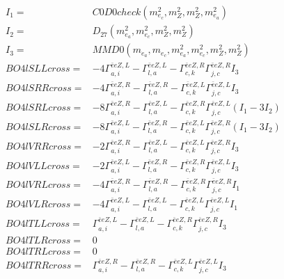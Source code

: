 \documentclass[A4,landscape]{article}
\begin{document}
\begin{align} 
I_1 = & C0D0check(m^2_{e_{{c}}}, m^2_{Z}, m^2_{Z}, m^2_{e_{{a}}}) \\ 
I_2 = & D_{27}(m^2_{e_{{a}}}, m^2_{e_{{c}}}, m^2_{Z}, m^2_{Z}) \\ 
I_3 = & MMD0(m_{e_{{a}}}, m_{e_{{c}}}, m^2_{e_{{a}}}, m^2_{e_{{c}}}, m^2_{Z}, m^2_{Z}) \\ 
  BO4lSLLcross= & -4  \Gamma^{\bar{e}e Z ,L}_{a, i} - \Gamma^{\bar{e}e Z ,L} _{l, a} - \Gamma^{\bar{e}e Z ,R} _{c, k} \Gamma^{\bar{e}e Z ,R}_{j, c} I_3 \\ 
  BO4lSRRcross= & -4  \Gamma^{\bar{e}e Z ,R}_{a, i} - \Gamma^{\bar{e}e Z ,R} _{l, a} - \Gamma^{\bar{e}e Z ,L} _{c, k} \Gamma^{\bar{e}e Z ,L}_{j, c} I_3 \\ 
  BO4lSRLcross= & -8  \Gamma^{\bar{e}e Z ,R}_{a, i} - \Gamma^{\bar{e}e Z ,L} _{l, a} - \Gamma^{\bar{e}e Z ,R} _{c, k} \Gamma^{\bar{e}e Z ,L}_{j, c} (I_1 - 3 I_2) \\ 
  BO4lSLRcross= & -8  \Gamma^{\bar{e}e Z ,L}_{a, i} - \Gamma^{\bar{e}e Z ,R} _{l, a} - \Gamma^{\bar{e}e Z ,L} _{c, k} \Gamma^{\bar{e}e Z ,R}_{j, c} (I_1 - 3 I_2) \\ 
  BO4lVRRcross= & -2  \Gamma^{\bar{e}e Z ,R}_{a, i} - \Gamma^{\bar{e}e Z ,L} _{l, a} - \Gamma^{\bar{e}e Z ,L} _{c, k} \Gamma^{\bar{e}e Z ,R}_{j, c} I_3 \\ 
  BO4lVLLcross= & -2  \Gamma^{\bar{e}e Z ,L}_{a, i} - \Gamma^{\bar{e}e Z ,R} _{l, a} - \Gamma^{\bar{e}e Z ,R} _{c, k} \Gamma^{\bar{e}e Z ,L}_{j, c} I_3 \\ 
  BO4lVRLcross= & -4  \Gamma^{\bar{e}e Z ,R}_{a, i} - \Gamma^{\bar{e}e Z ,R} _{l, a} - \Gamma^{\bar{e}e Z ,R} _{c, k} \Gamma^{\bar{e}e Z ,R}_{j, c} I_1 \\ 
  BO4lVLRcross= & -4  \Gamma^{\bar{e}e Z ,L}_{a, i} - \Gamma^{\bar{e}e Z ,L} _{l, a} - \Gamma^{\bar{e}e Z ,L} _{c, k} \Gamma^{\bar{e}e Z ,L}_{j, c} I_1 \\ 
  BO4lTLLcross= &  \Gamma^{\bar{e}e Z ,L}_{a, i} - \Gamma^{\bar{e}e Z ,L} _{l, a} - \Gamma^{\bar{e}e Z ,R} _{c, k} \Gamma^{\bar{e}e Z ,R}_{j, c} I_3 \\ 
  BO4lTLRcross= & 0 \\ 
  BO4lTRLcross= & 0 \\ 
  BO4lTRRcross= &  \Gamma^{\bar{e}e Z ,R}_{a, i} - \Gamma^{\bar{e}e Z ,R} _{l, a} - \Gamma^{\bar{e}e Z ,L} _{c, k} \Gamma^{\bar{e}e Z ,L}_{j, c} I_3 \\ 
\end{align} 
\end{document}
